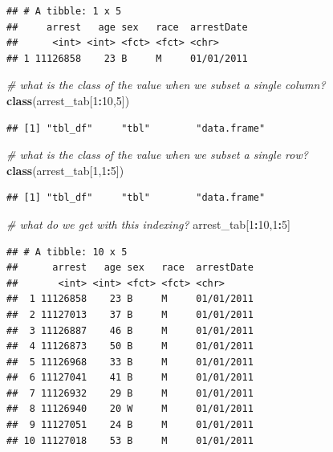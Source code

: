 \documentclass[12pt,]{book}
\newenvironment{Shaded}{\begin{snugshade}}{\end{snugshade}}
\newcommand{\KeywordTok}[1]{\textcolor[rgb]{0.13,0.29,0.53}{\textbf{#1}}}
\newcommand{\DecValTok}[1]{\textcolor[rgb]{0.00,0.00,0.81}{#1}}
\newcommand{\CommentTok}[1]{\textcolor[rgb]{0.56,0.35,0.01}{\textit{#1}}}
\newcommand{\OperatorTok}[1]{\textcolor[rgb]{0.81,0.36,0.00}{\textbf{#1}}}
\newcommand{\NormalTok}[1]{#1}
\theoremstyle{definition}
\theoremstyle{definition}
\theoremstyle{definition}
\theoremstyle{remark}
\begin{document}
\begin{verbatim}
## # A tibble: 1 x 5
##     arrest   age sex   race  arrestDate
##      <int> <int> <fct> <fct> <chr>     
## 1 11126858    23 B     M     01/01/2011
\end{verbatim}

\begin{Shaded}
\begin{Highlighting}[]
\CommentTok{# what is the class of the value when we subset a single column?}
\KeywordTok{class}\NormalTok{(arrest_tab[}\DecValTok{1}\OperatorTok{:}\DecValTok{10}\NormalTok{,}\DecValTok{5}\NormalTok{])}
\end{Highlighting}
\end{Shaded}

\begin{verbatim}
## [1] "tbl_df"     "tbl"        "data.frame"
\end{verbatim}

\begin{Shaded}
\begin{Highlighting}[]
\CommentTok{# what is the class of the value when we subset a single row?}
\KeywordTok{class}\NormalTok{(arrest_tab[}\DecValTok{1}\NormalTok{,}\DecValTok{1}\OperatorTok{:}\DecValTok{5}\NormalTok{])}
\end{Highlighting}
\end{Shaded}

\begin{verbatim}
## [1] "tbl_df"     "tbl"        "data.frame"
\end{verbatim}

\begin{Shaded}
\begin{Highlighting}[]
\CommentTok{# what do we get with this indexing?}
\NormalTok{arrest_tab[}\DecValTok{1}\OperatorTok{:}\DecValTok{10}\NormalTok{,}\DecValTok{1}\OperatorTok{:}\DecValTok{5}\NormalTok{]}
\end{Highlighting}
\end{Shaded}

\begin{verbatim}
## # A tibble: 10 x 5
##      arrest   age sex   race  arrestDate
##       <int> <int> <fct> <fct> <chr>     
##  1 11126858    23 B     M     01/01/2011
##  2 11127013    37 B     M     01/01/2011
##  3 11126887    46 B     M     01/01/2011
##  4 11126873    50 B     M     01/01/2011
##  5 11126968    33 B     M     01/01/2011
##  6 11127041    41 B     M     01/01/2011
##  7 11126932    29 B     M     01/01/2011
##  8 11126940    20 W     M     01/01/2011
##  9 11127051    24 B     M     01/01/2011
## 10 11127018    53 B     M     01/01/2011
\end{verbatim}
\end{document}
